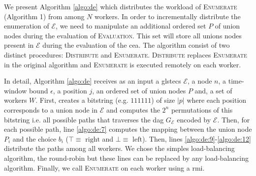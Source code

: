 \documentclass[12pt, a4paper]{article}
\begin{document}
\setlength{\interspacetitleruled}{-.4pt}%
\begin{algorithm}[H]
  \DontPrintSemicolon
  \SetAlgoNoEnd %
  \SetAlgoNoLine %
  \LinesNotNumbered
  \nl {}
\label{algo:enumerate}
\end{algorithm}

We present Algorithm \ref{algo:de} which distributes the workload of \textsc{Enumerate} (Algorithm 1) from \cite{core} among $N$ workers. In order to incrementally distribute the enumeration of $\mathcal{E}$, we need to manipulate an additional ordered set $P$ of union nodes during the evaluation of \textsc{Evaluation}. This set will store all unions nodes present in $\mathcal{E}$ during the evaluation of the \gls{cea}. The algorithm consist of two distinct procedures: \textsc{Distribute} and \textsc{Enumerate}. \textsc{Distribute} replaces \textsc{Enumerate} in the original algorithm and \textsc{Enumerate} is executed remotely on each worker.

In detail, Algorithm \ref{algo:de} receives as an input a gls{tecs} $\mathcal{E}$, a node $n$, a time-window bound $\epsilon$, a position $j$, an ordered set of union nodes $P$ and, a set of workers $W$. First, creates a bitstring (e.g. $111111$) of size $|p|$ where each position corresponds to a union node in $\mathcal{E}$ and computes the $2^{n}$ permutations of this bitstring i.e. all possible paths that traverses the \gls{dag} $G_{\mathcal{E}}$ encoded by $\mathcal{E}$. Then, for each possible path, line \ref{algo:de:7} computes the mapping between the union node $P_{i}$ and the choice $b_{i}$ ($\top \equiv \text{ right}$ and $\bot \equiv \text{ left}$). Then, lines \ref{algo:de:9}-\ref{algo:de:12} distribute the paths among all workers. We chose the simples load-balancing algorithm, the round-robin but these lines can be replaced by any load-balancing algorithm. Finally, we call \textsc{Enumerate} on each worker using a \gls{rmi}.
\end{document}
